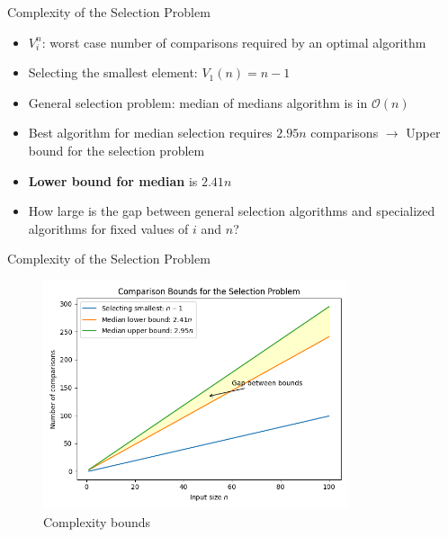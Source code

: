 \begin{frame}{Complexity of the Selection Problem}
  \begin{itemize}
    \item $V_i^n$: worst case number of comparisons required by an optimal algorithm 
    \item Selecting the smallest element: $V_1(n)=n-1$
    \item General selection problem: median of medians algorithm is in $\mathcal{O}(n)$
    \item Best algorithm for median selection requires $2.95n$ comparisons \textbf{$\rightarrow$} Upper bound for the selection problem
    \item \textbf{Lower bound for median} is $2.41n$
    \item How large is the gap between general selection algorithms and specialized algorithms for fixed values of $i$ and $n$?
  \end{itemize}
\end{frame}

\begin{frame}{Complexity of the Selection Problem}
  \begin{figure}
    \includegraphics[width=0.8\textwidth]{figures/bounds_diagram.png}
    \caption{Complexity bounds}
  \end{figure}
\end{frame}

